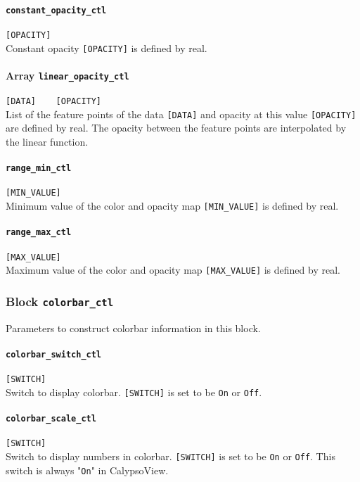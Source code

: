 \paragraph{\tt constant\_opacity\_ctl}
\label{href_t:constant_opacity_ctl}
\verb|[OPACITY]| \\
Constant opacity \verb|[OPACITY]| is defined by real.

\paragraph{Array {\tt linear\_opacity\_ctl}}
\label{href_t:linear_opacity_ctl}
\verb|[DATA]    [OPACITY]| \\
List of the feature points of the data \verb|[DATA]| and opacity at this value \verb|[OPACITY]| are defined by real. The opacity between the feature points are interpolated by the linear function.

\paragraph{\tt range\_min\_ctl}
\label{href_t:range_min_ctl}
\verb|[MIN_VALUE]| \\
Minimum value of the color and opacity map \verb|[MIN_VALUE]| is defined by real.

\paragraph{\tt range\_max\_ctl}
\label{href_t:range_max_ctl}
\verb|[MAX_VALUE]| \\
Maximum value of the color and opacity map \verb|[MAX_VALUE]| is defined by real.



\subsubsection{Block {\tt colorbar\_ctl}}
\label{href_t:colorbar_ctl}
Parameters to construct colorbar information in this block. \\

\paragraph{\tt colorbar\_switch\_ctl}
\label{href_t:colorbar_switch_ctl}
\verb|[SWITCH]| \\
Switch to display colorbar. \verb|[SWITCH]| is set to be \verb|On| or \verb|Off|.

\paragraph{\tt colorbar\_scale\_ctl}
\label{href_t:colorbar_scale_ctl}
\verb|[SWITCH]| \\
Switch to display numbers in colorbar. \verb|[SWITCH]| is set to be \verb|On| or \verb|Off|. This switch is always "\verb|On|" in CalypsoView.

